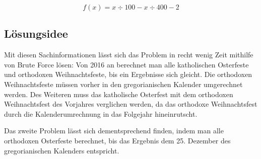 	\[f(x)=x\div{}100-x\div{}400-2\]

\clearpage
\subsection {Lösungsidee}
	Mit diesen Sachinformationen lässt sich das Problem in recht wenig Zeit mithilfe von Brute Force lösen: Von 2016 an berechnet man alle katholischen Osterfeste und orthodoxen Weihnachtsfeste, bis ein Ergebnisse sich gleicht. Die orthodoxen Weihnachtsfeste müssen vorher in den gregorianischen Kalender umgerechnet werden. Des Weiteren muss das katholische Osterfest mit dem orthodoxen Weihnachtsfest des Vorjahres verglichen werden, da das orthodoxe Weihnachtsfest  durch die Kalenderumrechnung in das Folgejahr hineinrutscht.

	Das zweite Problem lässt sich dementsprechend finden, indem man alle orthodoxen Osterfeste berechnet, bis das Ergebnis dem 25. Dezember des gregorianischen Kalenders entspricht.

